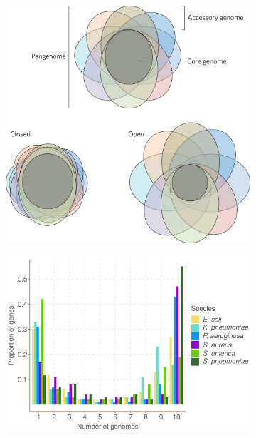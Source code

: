\begin{figure}
     \centering
     \begin{subfigure}[b]{0.475\textwidth}
        \includegraphics[height=0.21\textheight]{Chapter0/Figs/pangenome-venn.png}
        \centering
        \caption{}
        \label{fig:pangenome-venn}
     \end{subfigure}
     \begin{subfigure}[b]{0.475\textwidth}
         \centering
        \includegraphics[height=0.21\textheight]{Chapter0/Figs/gene_frequency_distribution.png}

\end{subfigure}
\end{figure}
